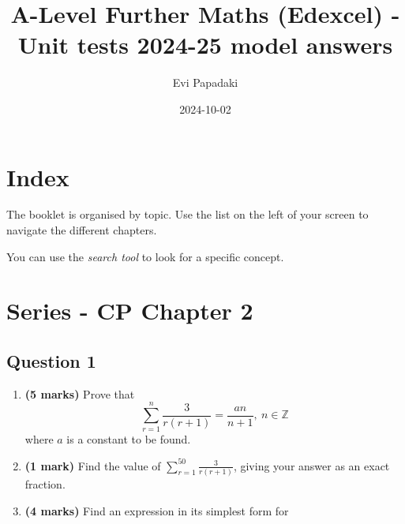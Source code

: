 \documentclass[
  a4paper,
]{report}
\title{A-Level Further Maths (Edexcel) - Unit tests 2024-25 model
answers}
\author{Evi Papadaki}
\date{2024-10-02}
\renewcommand*\contentsname{Table of contents}
\newcommand\contentsname{Table of contents}
\begin{document}
\maketitle

\renewcommand*\contentsname{Table of contents}
{
\hypersetup{linkcolor=}
\setcounter{tocdepth}{2}
\tableofcontents
}


\chapter*{Index}\label{index}


The booklet is organised by topic. Use the list on the left of your
screen to navigate the different chapters.

\begin{tcolorbox}[enhanced jigsaw, title=\textcolor{quarto-callout-tip-color}{\faLightbulb}\hspace{0.5em}{Tip}, titlerule=0mm, colbacktitle=quarto-callout-tip-color!10!white, coltitle=black, toprule=.15mm, colframe=quarto-callout-tip-color-frame, breakable, bottomtitle=1mm, toptitle=1mm, arc=.35mm, rightrule=.15mm, bottomrule=.15mm, left=2mm, opacitybacktitle=0.6, leftrule=.75mm, opacityback=0, colback=white]

You can use the \emph{search tool} to look for a specific concept.

\end{tcolorbox}


\chapter{Series - CP Chapter 2}\label{series---cp-chapter-2}

\section{Question 1}\label{question-1}

\begin{enumerate}
\def\labelenumi{\alph{enumi}.}
\item
  \textbf{(5 marks)} Prove that
  \[\sum_{r = 1}^{n}{\frac{3}{r(r + 1)} = \frac{an}{n + 1},\ n} \in \mathbb{Z}\]
  where \(a\) is a constant to be found.
\item
  \textbf{(1 mark)} Find the value of
  \(\sum_{r = 1}^{50}{\frac{3}{r(r + 1)}}\), giving your answer as an
  exact fraction.
\item
  \textbf{(4 marks)} Find an expression in its simplest form for
\end{enumerate}
\end{document}
